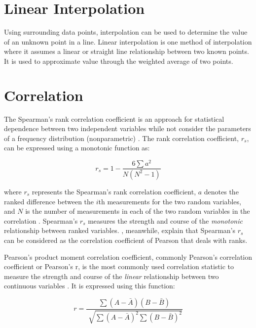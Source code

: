 \section{Linear Interpolation}
Using surrounding data points, interpolation can be used to determine the value of an unknown point in a line. Linear interpolation is one method of interpolation where it assumes a linear or straight line relationship between two known points. It is used to approximate value through the weighted average of two points.




\section{Correlation}
The Spearman's rank correlation coefficient is an approach for statistical dependence between two independent variables while not consider the parameters of a frequency distribution (nonparametric) . The rank correlation coefficient, $r_s$, can be expressed using a monotonic function as: 

\begin {equation}
r_s = 1 - \frac{6 \sum a^2}{N(N^2 - 1)}
\end{equation}

\noindent where $r_s$  represents the Spearman’s rank correlation coefficient, $a$ denotes the ranked difference between the $i$th measurements for the two random variables, and $N$ is the number of measurements in each of the two random variables in the correlation . Spearman’s $r_s$ measures the strength and course of the \textit{monotonic} relationship between ranked variables. , meanwhile, explain that Spearman’s $r_s$ can be considered as the correlation coefficient of Pearson that deals with ranks.  

Pearson’s product moment correlation coefficient, commonly Pearson’s correlation coefficient or Pearson’s r, is the most commonly used correlation statistic to measure the strength and course of the \textit{linear} relationship between two continuous variables . It is expressed using this function:

\begin {equation}
r = \frac{\sum (A - \bar{A})(B - \bar{B})}{\sqrt[]{\sum (A - \bar{A})^2 \sum(B - \bar{B})^2}}
\end{equation}

